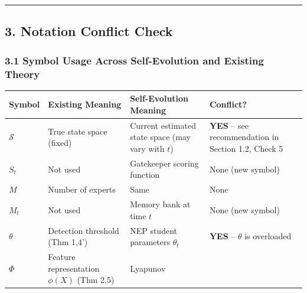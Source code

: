 \documentclass[
  12pt,
]{article}
\begin{document}
\begin{center}\rule{0.5\linewidth}{0.5pt}\end{center}

\subsection{3. Notation Conflict Check}\label{notation-conflict-check}

\subsubsection{3.1 Symbol Usage Across Self-Evolution and Existing
Theory}\label{symbol-usage-across-self-evolution-and-existing-theory}

\begin{longtable}[]{@{}
  >{\raggedright\arraybackslash}p{}
  >{\raggedright\arraybackslash}p{}
  >{\raggedright\arraybackslash}p{}
  >{\raggedright\arraybackslash}p{}@{}}
\toprule\noalign{}
\begin{minipage}[b]{\linewidth}\raggedright
Symbol
\end{minipage} & \begin{minipage}[b]{\linewidth}\raggedright
Existing Meaning
\end{minipage} & \begin{minipage}[b]{\linewidth}\raggedright
Self-Evolution Meaning
\end{minipage} & \begin{minipage}[b]{\linewidth}\raggedright
Conflict?
\end{minipage} \\
\midrule\noalign{}
\endhead
\bottomrule\noalign{}
\endlastfoot
\(\mathcal{S}\) & True state space (fixed) & Current estimated state
space (may vary with \(t\)) & \textbf{YES} -- see recommendation in
Section 1.2, Check 5 \\
\(S_t\) & Not used & Gatekeeper scoring function & None (new symbol) \\
\(M\) & Number of experts & Same & None \\
\(M_t\) & Not used & Memory bank at time \(t\) & None (new symbol) \\
\(\theta\) & Detection threshold (Thm 1,4') & NEP student parameters
\(\theta_t\) & \textbf{YES} -- \(\theta\) is overloaded \\
\(\Phi\) & Feature representation \(\phi(X)\) (Thm 2,5) & Lyapunov

\end{longtable}
\end{document}

